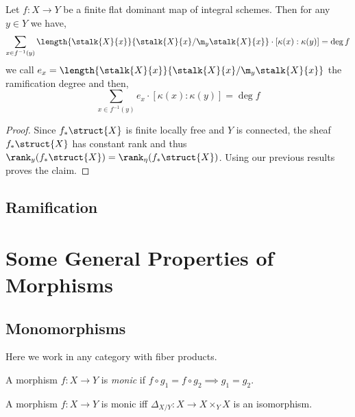 \documentclass[12pt]{article}
\begin{document}
\begin{prop}
Let $f : X \to Y$ be a finite flat dominant map of integral schemes. Then for any $y \in Y$ we have,
\[ \sum_{x \in f^{-1}(y)} \length{\stalk{X}{x}}{\stalk{X}{x} / \m_y \stalk{X}{x}} \cdot [\kappa(x) : \kappa(y)] = \deg{f} \]
we call $e_x = \length{\stalk{X}{x}}{\stalk{X}{x} / \m_y \stalk{X}{x}}$ the ramification degree and then,
\[ \sum_{x \in f^{-1}(y)} e_x \cdot [\kappa(x) : \kappa(y)] = \deg{f} \]
\end{prop}

\begin{proof}
Since $f_* \struct{X}$ is finite locally free and $Y$ is connected, the sheaf $f_* \struct{X}$ has constant rank and thus $\rank_y(f_*\struct{X}) = \rank_\eta(f_* \struct{X})$. Using our previous results proves the claim.
\end{proof}

\subsection{Ramification}

\section{Some General Properties of Morphisms}

\subsection{Monomorphisms}

\begin{rmk}
Here we work in any category with fiber products.
\end{rmk}

\begin{defn}
A morphism $f : X \to Y$ is \textit{monic} if $f \circ g_1 = f \circ g_2 \implies g_1 = g_2$.
\end{defn}

\begin{prop}
A morphism $f : X \to Y$ is monic iff $\Delta_{X/Y} : X \to X \times_Y X$ is an isomorphism.
\end{prop}
\end{document}
